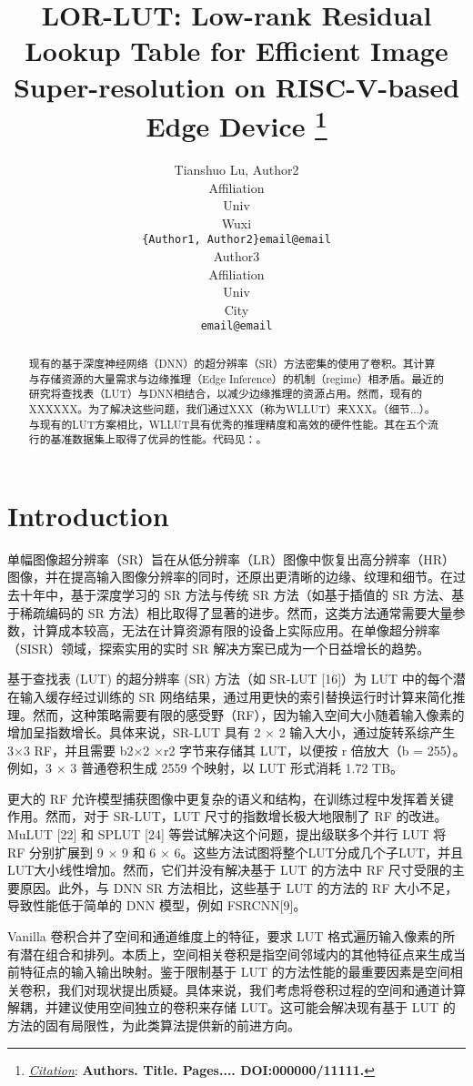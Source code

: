 \documentclass[a4paper]{article}
\title{LOR-LUT: Low-rank Residual Lookup Table for Efficient Image Super-resolution on RISC-V-based Edge Device
\thanks{\textit{\underline{Citation}}: 
\textbf{Authors. Title. Pages.... DOI:000000/11111.}} 
}
\author{
  Tianshuo Lu, Author2 \\
  Affiliation \\
  Univ \\
  Wuxi\\
  \texttt{\{Author1, Author2\}email@email} \\
   \And
  Author3 \\
  Affiliation \\
  Univ \\
  City\\
  \texttt{email@email} \\
}
\begin{document}
\maketitle


\begin{abstract}
现有的基于深度神经网络（DNN）的超分辨率（SR）方法密集的使用了卷积。其计算与存储资源的大量需求与边缘推理（Edge Inference）的机制（regime）相矛盾。最近的研究将查找表（LUT）与DNN相结合，以减少边缘推理的资源占用。然而，现有的XXXXXX。为了解决这些问题，我们通过XXX（称为WLLUT）来XXX。（细节...）。与现有的LUT方案相比，WLLUT具有优秀的推理精度和高效的硬件性能。其在五个流行的基准数据集上取得了优异的性能。代码见：。
\end{abstract}




\section{Introduction}
单幅图像超分辨率（SR）旨在从低分辨率（LR）图像中恢复出高分辨率（HR）图像，并在提高输入图像分辨率的同时，还原出更清晰的边缘、纹理和细节。在过去十年中，基于深度学习的 SR 方法与传统 SR 方法（如基于插值的 SR 方法、基于稀疏编码的 SR 方法）相比取得了显著的进步。然而，这类方法通常需要大量参数，计算成本较高，无法在计算资源有限的设备上实际应用。在单像超分辨率（SISR）领域，探索实用的实时 SR 解决方案已成为一个日益增长的趋势。

基于查找表 (LUT) 的超分辨率 (SR) 方法（如 SR-LUT [16]）为 LUT 中的每个潜在输入缓存经过训练的 SR 网络结果，通过用更快的索引替换运行时计算来简化推理。然而，这种策略需要有限的感受野（RF），因为输入空间大小随着输入像素的增加呈指数增长。具体来说，SR-LUT 具有 2 × 2 输入大小，通过旋转系综产生 3×3 RF，并且需要 b2×2 ×r2 字节来存储其 LUT，以便按 r 倍放大（b = 255）。例如，3 × 3 普通卷积生成 2559 个映射，以 LUT 形式消耗 1.72 TB。

更大的 RF 允许模型捕获图像中更复杂的语义和结构，在训练过程中发挥着关键作用。然而，对于 SR-LUT，LUT 尺寸的指数增长极大地限制了 RF 的改进。 MuLUT [22] 和 SPLUT [24] 等尝试解决这个问题，提出级联多个并行 LUT 将 RF 分别扩展到 9 × 9 和 6 × 6。这些方法试图将整个LUT分成几个子LUT，并且LUT大小线性增加。然而，它们并没有解决基于 LUT 的方法中 RF 尺寸受限的主要原因。此外，与 DNN SR 方法相比，这些基于 LUT 的方法的 RF 大小不足，导致性能低于简单的 DNN 模型，例如 FSRCNN[9]。

Vanilla 卷积合并了空间和通道维度上的特征，要求 LUT 格式遍历输入像素的所有潜在组合和排列。本质上，空间相关卷积是指空间邻域内的其他特征点来生成当前特征点的输入输出映射。鉴于限制基于 LUT 的方法性能的最重要因素是空间相关卷积，我们对现状提出质疑。具体来说，我们考虑将卷积过程的空间和通道计算解耦，并建议使用空间独立的卷积来存储 LUT。这可能会解决现有基于 LUT 的方法的固有局限性，为此类算法提供新的前进方向。
\end{document}
